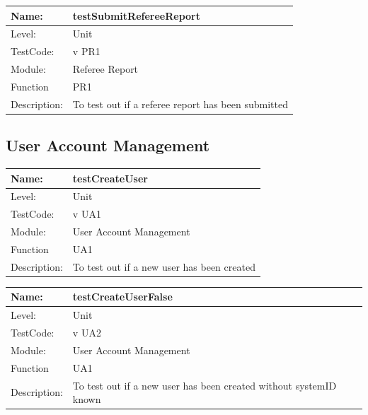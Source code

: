 \documentclass[12pt]{article}
\begin{document}
\begin{flushleft}
\begin{center}
\begin{tabular}{|l|p{12cm}|}
\end{tabular}
\end{center}

\begin{center}
\begin{tabular}{|l|p{12cm}|}
\hline

 Name: & testSubmitRefereeReport \\
\hline
Level: & Unit \\
\hline
TestCode: & v PR1 \\
\hline
Module:& Referee Report\\
\hline
Function & PR1 \\
\hline
Description: & To test out if a referee report has been submitted \\
\hline

\end{tabular}
\end{center}

\subsection{User Account Management}
\begin{center}
\begin{tabular}{|l|p{12cm}|}
\hline

 Name: & testCreateUser \\
\hline
Level: & Unit \\
\hline
TestCode: & v UA1 \\
\hline
Module:& User Account Management\\
\hline
Function & UA1 \\
\hline
Description: & To test out if a new user has been created \\
\hline

\end{tabular}
\end{center}


\begin{center}
\begin{tabular}{|l|p{12cm}|}
\hline

 Name: & testCreateUserFalse \\
\hline
Level: & Unit \\
\hline
TestCode: & v UA2 \\
\hline
Module:& User Account Management\\
\hline
Function & UA1 \\
\hline
Description: & To test out if a new user has been created without systemID known\\
\hline


\end{tabular}
\end{center}
\end{flushleft}
\end{document}
